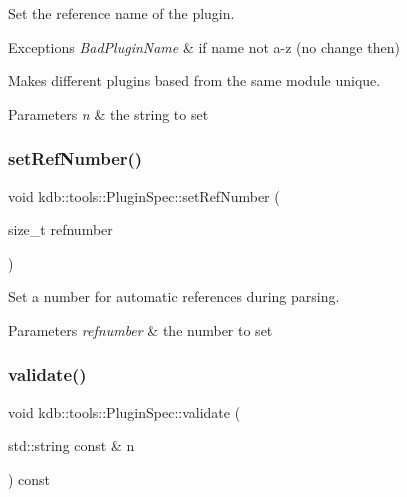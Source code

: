 Set the reference name of the plugin. 


\begin{DoxyExceptions}{Exceptions}
{\em Bad\+Plugin\+Name} & if name not a-\/z (no change then)\\
\hline
\end{DoxyExceptions}
Makes different plugins based from the same module unique.


\begin{DoxyParams}{Parameters}
{\em n} & the string to set \\
\hline
\end{DoxyParams}
\mbox{\label{classkdb_1_1tools_1_1PluginSpec_a927d2ce32f321136f626c6489e47089e}} 
\subsubsection{\texorpdfstring{setRefNumber()}{setRefNumber()}}
{\footnotesize\ttfamily void kdb\+::tools\+::\+Plugin\+Spec\+::set\+Ref\+Number (\begin{DoxyParamCaption}\item[{size\+\_\+t}]{refnumber }\end{DoxyParamCaption})}



Set a number for automatic references during parsing. 


\begin{DoxyParams}{Parameters}
{\em refnumber} & the number to set \\
\hline
\end{DoxyParams}
\mbox{\label{classkdb_1_1tools_1_1PluginSpec_a26c3e9943430571562ad466ac70ce4d6}} 
\subsubsection{\texorpdfstring{validate()}{validate()}}
{\footnotesize\ttfamily void kdb\+::tools\+::\+Plugin\+Spec\+::validate (\begin{DoxyParamCaption}\item[{std\+::string const \&}]{n }\end{DoxyParamCaption}) const}



